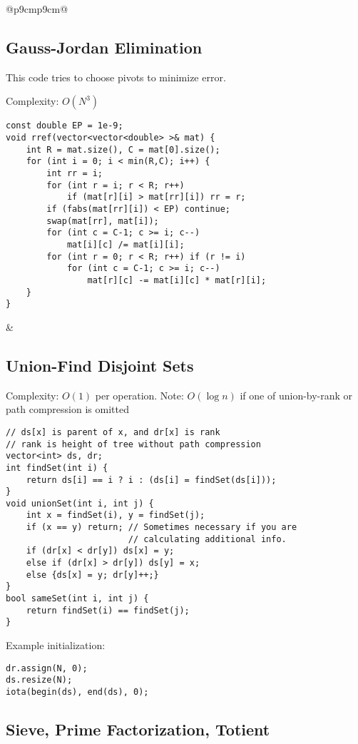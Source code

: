\documentclass[letterpaper]{article}
\begin{document}
\begin{tabular}{@{}p{9cm}p{9cm}@{}}
    \subsection{Gauss-Jordan Elimination}

    This code tries to choose pivots to minimize error.

    Complexity: $O\left(N^3\right)$

    \begin{lstlisting}
const double EP = 1e-9;
void rref(vector<vector<double> >& mat) {
	int R = mat.size(), C = mat[0].size();
	for (int i = 0; i < min(R,C); i++) {
		int rr = i;
		for (int r = i; r < R; r++)
			if (mat[r][i] > mat[rr][i]) rr = r;
		if (fabs(mat[rr][i]) < EP) continue;
		swap(mat[rr], mat[i]);
		for (int c = C-1; c >= i; c--)
			mat[i][c] /= mat[i][i];
		for (int r = 0; r < R; r++) if (r != i)
			for (int c = C-1; c >= i; c--)
				mat[r][c] -= mat[i][c] * mat[r][i];
	}
}
\end{lstlisting}
     &
    \subsection{Union-Find Disjoint Sets}

    Complexity: $O\left(1\right)$ per operation. Note: $O\left(\log n\right)$ if one of union-by-rank or path compression is omitted

    \begin{lstlisting}
// ds[x] is parent of x, and dr[x] is rank
// rank is height of tree without path compression
vector<int> ds, dr;
int findSet(int i) {
	return ds[i] == i ? i : (ds[i] = findSet(ds[i]));
}
void unionSet(int i, int j) {
	int x = findSet(i), y = findSet(j);
	if (x == y) return; // Sometimes necessary if you are
	                    // calculating additional info.
	if (dr[x] < dr[y]) ds[x] = y;
	else if (dr[x] > dr[y]) ds[y] = x;
	else {ds[x] = y; dr[y]++;}
}
bool sameSet(int i, int j) {
	return findSet(i) == findSet(j);
}
\end{lstlisting}

    Example initialization:

    \begin{lstlisting}
dr.assign(N, 0);
ds.resize(N);
iota(begin(ds), end(ds), 0);
\end{lstlisting}
\end{tabular}

\clearpage
\subsection{Sieve, Prime Factorization, Totient}
\end{document}
